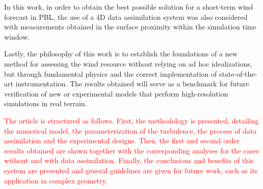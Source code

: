 In this work, in order to obtain the best possible solution for a short-term wind forecast in PBL, the use of a 4D data assimilation system was also considered with measurements obtained in the surface proximity within the simulation time window.

Lastly, the philosophy of this work is to establish the foundations of a new method for assessing the wind resource without relying on ad hoc idealizations, but through fundamental physics and the correct implementation of state-of-the-art instrumentation. The results obtained will serve as a benchmark for future verification of new or experimental models that perform high-resolution simulations in real terrain.

\textcolor{red}{The article is structured as follows. First, the methodology is presented, detailing the numerical model, the parameterization of the turbulence, the process of data assimilation and the experimental designs. Then, the first and second order results obtained are shown together with the corresponding analyses for the cases without and with data assimilation. Finally, the conclusions and benefits of this system are presented and general guidelines are given for future work, such as its application in complex geometry.}
